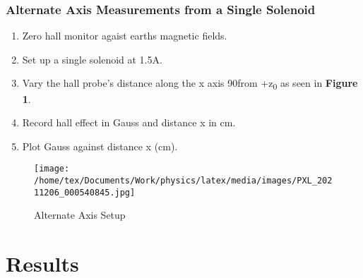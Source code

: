 \documentclass{article}
\begin{document}
   \subsubsection{Alternate Axis Measurements from a Single Solenoid}
   \begin{enumerate}
       \item Zero hall monitor agaist earths magnetic fields.
       \item Set up a single solenoid at 1.5A.
       \item Vary the hall probe's distance along the x axis 90\degree from +z\textsubscript{0} as seen in \textbf{Figure 1}.
       \item Record hall effect in Gauss and distance x in cm.
       \item Plot Gauss against distance x (cm).
   \end{enumerate}
   \begin{figure}
       \centering
       \texttt{[image: /home/tex/Documents/Work/physics/latex/media/images/PXL\_20211206\_000540845.jpg]}
       \caption{Alternate Axis Setup}
   \end{figure}
   
   \section{Results}
\end{document}
